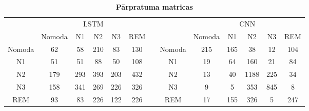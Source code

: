 \documentclass[12pt,paper=A4]{report}
\begin{document}
\begin{table}[H]
\centering
\caption{}
\captionsetup{justification=centering}
\caption*{\textbf{Pārpratuma matricas}}
\begin{tabular}{cccccclcccccc}
\multicolumn{1}{l}{} & \multicolumn{5}{c}{LSTM} &  & \multicolumn{1}{l}{} & \multicolumn{5}{c}{CNN} \\ \cline{2-6} \cline{9-13} 
\multicolumn{1}{l|}{} & \multicolumn{1}{c|}{Nomoda} & \multicolumn{1}{c|}{N1} & \multicolumn{1}{c|}{N2} & \multicolumn{1}{c|}{N3} & \multicolumn{1}{c|}{REM} &  & \multicolumn{1}{l|}{} & \multicolumn{1}{c|}{Nomoda} & \multicolumn{1}{c|}{N1} & \multicolumn{1}{c|}{N2} & \multicolumn{1}{c|}{N3} & \multicolumn{1}{c|}{REM} \\ \cline{1-6} \cline{8-13} 
\multicolumn{1}{|c|}{Nomoda} & \multicolumn{1}{c|}{\cellcolor[HTML]{FFFFC7}62} & \multicolumn{1}{c|}{58} & \multicolumn{1}{c|}{210} & \multicolumn{1}{c|}{83} & \multicolumn{1}{c|}{130} & \multicolumn{1}{l|}{} & \multicolumn{1}{c|}{Nomoda} & \multicolumn{1}{c|}{\cellcolor[HTML]{FFFFC7}215} & \multicolumn{1}{c|}{165} & \multicolumn{1}{c|}{38} & \multicolumn{1}{c|}{12} & \multicolumn{1}{c|}{104} \\ \cline{1-6} \cline{8-13} 
\multicolumn{1}{|c|}{N1} & \multicolumn{1}{c|}{51} & \multicolumn{1}{c|}{\cellcolor[HTML]{FFFFC7}51} & \multicolumn{1}{c|}{88} & \multicolumn{1}{c|}{50} & \multicolumn{1}{c|}{108} & \multicolumn{1}{l|}{} & \multicolumn{1}{c|}{N1} & \multicolumn{1}{c|}{19} & \multicolumn{1}{c|}{\cellcolor[HTML]{FFFFC7}64} & \multicolumn{1}{c|}{160} & \multicolumn{1}{c|}{21} & \multicolumn{1}{c|}{84} \\ \cline{1-6} \cline{8-13} 
\multicolumn{1}{|c|}{N2} & \multicolumn{1}{c|}{179} & \multicolumn{1}{c|}{293} & \multicolumn{1}{c|}{\cellcolor[HTML]{FFFFC7}393} & \multicolumn{1}{c|}{203} & \multicolumn{1}{c|}{432} & \multicolumn{1}{l|}{} & \multicolumn{1}{c|}{N2} & \multicolumn{1}{c|}{13} & \multicolumn{1}{c|}{40} & \multicolumn{1}{c|}{\cellcolor[HTML]{FFFFC7}1188} & \multicolumn{1}{c|}{225} & \multicolumn{1}{c|}{34} \\ \cline{1-6} \cline{8-13} 
\multicolumn{1}{|c|}{N3} & \multicolumn{1}{c|}{158} & \multicolumn{1}{c|}{341} & \multicolumn{1}{c|}{269} & \multicolumn{1}{c|}{\cellcolor[HTML]{FFFFC7}226} & \multicolumn{1}{c|}{326} & \multicolumn{1}{l|}{} & \multicolumn{1}{c|}{N3} & \multicolumn{1}{c|}{9} & \multicolumn{1}{c|}{5} & \multicolumn{1}{c|}{353} & \multicolumn{1}{c|}{\cellcolor[HTML]{FFFFC7}845} & \multicolumn{1}{c|}{8} \\ \cline{1-6} \cline{8-13} 
\multicolumn{1}{|c|}{REM} & \multicolumn{1}{c|}{93} & \multicolumn{1}{c|}{83} & \multicolumn{1}{c|}{226} & \multicolumn{1}{c|}{122} & \multicolumn{1}{c|}{\cellcolor[HTML]{FFFFC7}226} & \multicolumn{1}{l|}{} & \multicolumn{1}{c|}{REM} & \multicolumn{1}{c|}{17} & \multicolumn{1}{c|}{155} & \multicolumn{1}{c|}{326} & \multicolumn{1}{c|}{5} & \multicolumn{1}{c|}{\cellcolor[HTML]{FFFFC7}247} \\ \cline{1-6} \cline{8-13} 

\end{tabular}
\label{matrixOfConf}
\end{table}
\end{document}
